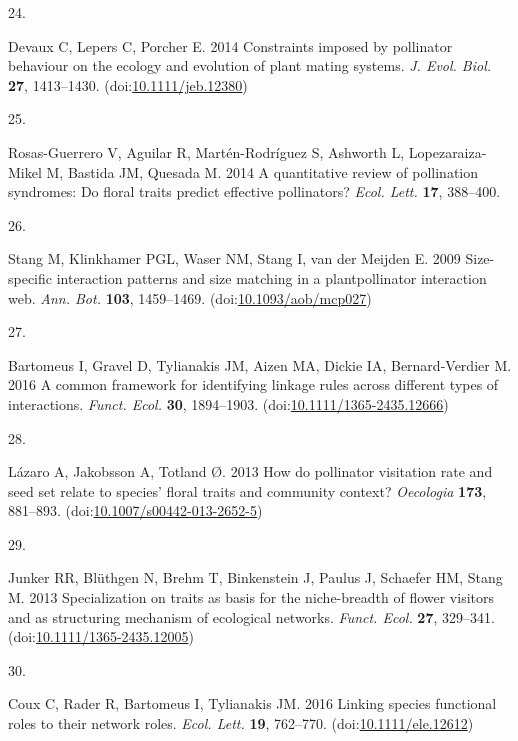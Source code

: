 \documentclass[
  12pt,
  a4paper,
]{article}
\newlength{\cslhangindent}
\newlength{\csllabelwidth}
\newlength{\cslentryspacingunit} %
\newenvironment{CSLReferences}[2] %
 {%
  \setlength{\parindent}{0pt}
  \ifodd #1
  \let\oldpar\par
  \def\par{\hangindent=\cslhangindent\oldpar}
  \fi
  \setlength{\parskip}{#2\cslentryspacingunit}
 }%
 {}
\newcommand{\CSLLeftMargin}[1]{\parbox[t]{\csllabelwidth}{#1}}
\newcommand{\CSLRightInline}[1]{\parbox[t]{\linewidth - \csllabelwidth}{#1}\break}
\begin{document}
\begin{CSLReferences}{0}{0}
\leavevmode{}%
\CSLLeftMargin{24. }
\CSLRightInline{Devaux C, Lepers C, Porcher E. 2014 Constraints imposed by pollinator behaviour on the ecology and evolution of plant mating systems. \emph{J. Evol. Biol.} \textbf{27}, 1413--1430. (doi:\href{https://doi.org/10.1111/jeb.12380}{10.1111/jeb.12380})}

\leavevmode{}%
\CSLLeftMargin{25. }
\CSLRightInline{Rosas-Guerrero V, Aguilar R, Martén-Rodríguez S, Ashworth L, Lopezaraiza-Mikel M, Bastida JM, Quesada M. 2014 A quantitative review of pollination syndromes: Do floral traits predict effective pollinators? \emph{Ecol. Lett.} \textbf{17}, 388--400.}

\leavevmode{}%
\CSLLeftMargin{26. }
\CSLRightInline{Stang M, Klinkhamer PGL, Waser NM, Stang I, van der Meijden E. 2009 Size-specific interaction patterns and size matching in a plant\textendash pollinator interaction web. \emph{Ann. Bot.} \textbf{103}, 1459--1469. (doi:\href{https://doi.org/10.1093/aob/mcp027}{10.1093/aob/mcp027})}

\leavevmode{}%
\CSLLeftMargin{27. }
\CSLRightInline{Bartomeus I, Gravel D, Tylianakis JM, Aizen MA, Dickie IA, Bernard-Verdier M. 2016 A common framework for identifying linkage rules across different types of interactions. \emph{Funct. Ecol.} \textbf{30}, 1894--1903. (doi:\href{https://doi.org/10.1111/1365-2435.12666}{10.1111/1365-2435.12666})}

\leavevmode{}%
\CSLLeftMargin{28. }
\CSLRightInline{Lázaro A, Jakobsson A, Totland Ø. 2013 How do pollinator visitation rate and seed set relate to species' floral traits and community context? \emph{Oecologia} \textbf{173}, 881--893. (doi:\href{https://doi.org/10.1007/s00442-013-2652-5}{10.1007/s00442-013-2652-5})}

\leavevmode{}%
\CSLLeftMargin{29. }
\CSLRightInline{Junker RR, Blüthgen N, Brehm T, Binkenstein J, Paulus J, Schaefer HM, Stang M. 2013 Specialization on traits as basis for the niche-breadth of flower visitors and as structuring mechanism of ecological networks. \emph{Funct. Ecol.} \textbf{27}, 329--341. (doi:\href{https://doi.org/10.1111/1365-2435.12005}{10.1111/1365-2435.12005})}

\leavevmode{}%
\CSLLeftMargin{30. }
\CSLRightInline{Coux C, Rader R, Bartomeus I, Tylianakis JM. 2016 Linking species functional roles to their network roles. \emph{Ecol. Lett.} \textbf{19}, 762--770. (doi:\href{https://doi.org/10.1111/ele.12612}{10.1111/ele.12612})}


\end{CSLReferences}
\end{document}
